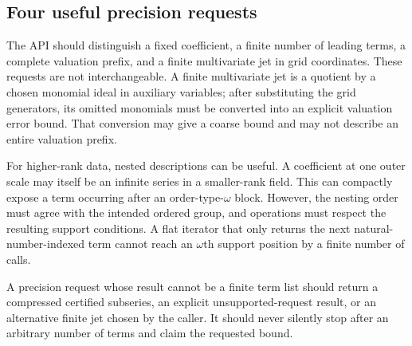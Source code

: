\documentclass[11pt,letterpaper]{article}
\numberwithin{equation}{section}
\theoremstyle{definition}
\theoremstyle{remark}\newtheorem{remark}[theorem]{Remark}
\begin{document}
\subsection{Four useful precision requests}
The API should distinguish a fixed coefficient, a finite number of leading
terms, a complete valuation prefix, and a finite multivariate jet in grid
coordinates. These requests are not interchangeable. A finite multivariate
jet is a quotient by a chosen monomial ideal in auxiliary variables; after
substituting the grid generators, its omitted monomials must be converted
into an explicit valuation error bound. That conversion may give a coarse
bound and may not describe an entire valuation prefix.

For higher-rank data, nested descriptions can be useful. A coefficient at one
outer scale may itself be an infinite series in a smaller-rank field. This
can compactly expose a term occurring after an order-type-$\omega$ block.
However, the nesting order must agree with the intended ordered group, and
operations must respect the resulting support conditions. A flat iterator
that only returns the next natural-number-indexed term cannot reach an
$\omega$th support position by a finite number of calls.

A precision request whose result cannot be a finite term list should return
a compressed certified subseries, an explicit unsupported-request result,
or an alternative finite jet chosen by the caller. It should never silently
stop after an arbitrary number of terms and claim the requested bound.
\end{document}
